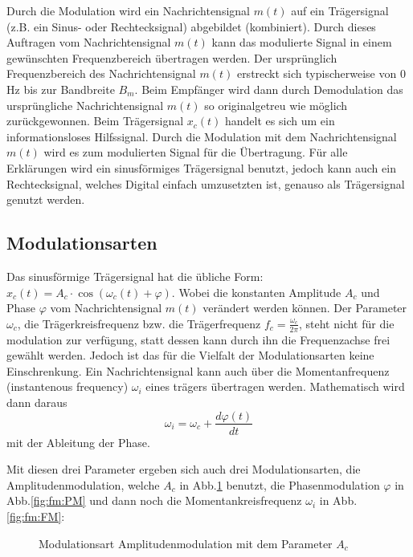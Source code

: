 %
%
%

Durch die Modulation wird ein Nachrichtensignal \(m(t)\) auf ein Trägersignal (z.B. ein Sinus- oder Rechtecksignal) abgebildet (kombiniert).
Durch dieses Auftragen vom Nachrichtensignal \(m(t)\) kann das modulierte Signal in einem gewünschten Frequenzbereich übertragen werden.
Der ursprünglich Frequenzbereich des Nachrichtensignal \(m(t)\) erstreckt sich typischerweise von 0 Hz bis zur Bandbreite \(B_m\).
Beim Empfänger wird dann durch Demodulation das ursprüngliche Nachrichtensignal \(m(t)\) so originalgetreu wie möglich zurückgewonnen.
Beim Trägersignal \(x_c(t)\) handelt es sich um ein informationsloses Hilfssignal.
Durch die Modulation mit dem Nachrichtensignal \(m(t)\) wird es zum modulierten Signal für die Übertragung.
Für alle Erklärungen wird ein sinusförmiges Trägersignal benutzt, jedoch kann auch ein Rechtecksignal,
welches Digital einfach umzusetzten ist, 
genauso als Trägersignal genutzt werden.\cite{fm:NAT}

\subsection{Modulationsarten\label{fm:section:modulation}}

Das sinusförmige Trägersignal hat die übliche Form: 
\(x_c(t) = A_c \cdot \cos(\omega_c(t)+\varphi)\).
Wobei die konstanten Amplitude \(A_c\) und Phase \(\varphi\) vom Nachrichtensignal \(m(t)\) verändert werden können.
Der Parameter \(\omega_c\), die Trägerkreisfrequenz bzw. die Trägerfrequenz \(f_c = \frac{\omega_c}{2\pi}\),
steht nicht für die modulation zur verfügung, statt dessen kann durch ihn die Frequenzachse frei gewählt werden.
\newblockpunct
Jedoch ist das für die Vielfalt der Modulationsarten keine Einschrenkung.
Ein Nachrichtensignal kann auch über die Momentanfrequenz (instantenous frequency) \(\omega_i\) eines trägers übertragen werden.
Mathematisch wird dann daraus
\[
    \omega_i = \omega_c + \frac{d \varphi(t)}{dt}
\]
mit der Ableitung der Phase\cite{fm:NAT}.

Mit diesen drei Parameter ergeben sich auch drei Modulationsarten, die Amplitudenmodulation, welche \(A_c\) in Abb.\ref{fig:fm:AM} benutzt, 
die Phasenmodulation \(\varphi\) in Abb.\ref{fig:fm:PM} und dann noch die Momentankreisfrequenz \(\omega_i\) in Abb.\ref{fig:fm:FM}: 

\begin{figure}
    \centering
	
	\caption{Modulationsart Amplitudenmodulation mit dem Parameter \(A_c\)}
	\label{fig:fm:AM}
\end{figure}

